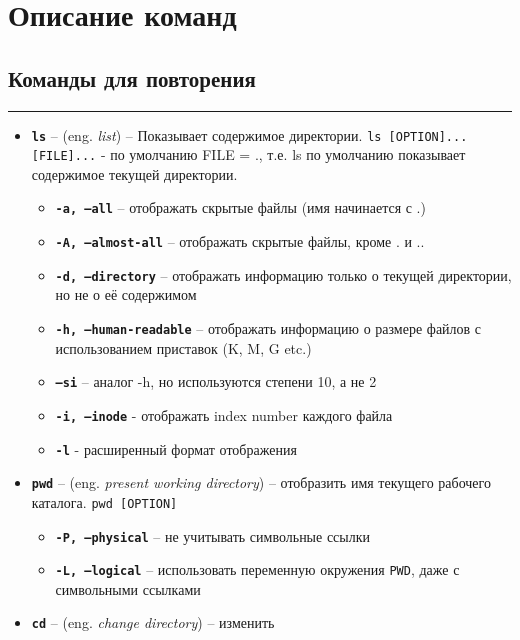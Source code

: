 \documentclass[12pt, a4paper]{article}
\begin{document}

\section{Описание команд}
\subsection{Команды для повторения}
\par\noindent\rule{\textwidth}{0.4pt}
\begin{itemize}
  \item \textbf{\texttt{ls}} -- (eng. \textit{list}) -- Показывает содержимое
    директории. \texttt{ls [OPTION]... [FILE]...} - по умолчанию FILE = ., т.е.
    ls по умолчанию показывает содержимое текущей директории.
    \begin{itemize}
      \item \textbf{\texttt{-a, --all}} -- отображать скрытые файлы (имя
        начинается с .)
      \item \textbf{\texttt{-A, --almost-all}} -- отображать скрытые файлы,
        кроме . и ..
      \item \textbf{\texttt{-d, --directory}} -- отображать информацию только
        о текущей директории, но не о её содержимом
      \item \textbf{\texttt{-h, --human-readable}} -- отображать информацию о
        размере файлов с использованием приставок (K, M, G etc.)
      \item \textbf{\texttt{--si}} -- аналог -h, но используются степени 10, а
        не 2
      \item \textbf{\texttt{-i, --inode}} - отображать index number каждого файла
      \item \textbf{\texttt{-l}} - расширенный формат отображения
    \end{itemize}
  \item \textbf{\texttt{pwd}} -- (eng. \textit{present working directory}) --
    отобразить имя текущего рабочего каталога. \texttt{pwd [OPTION]}
    \begin{itemize}
      \item \textbf{\texttt{-P, --physical}} -- не учитывать символьные ссылки
      \item \textbf{\texttt{-L, --logical}} -- использовать переменную окружения
        \texttt{PWD}, даже с символьными ссылками
    \end{itemize}
  \item \textbf{\texttt{cd}} -- (eng. \textit{change directory}) -- изменить

\end{itemize}
\end{document}
